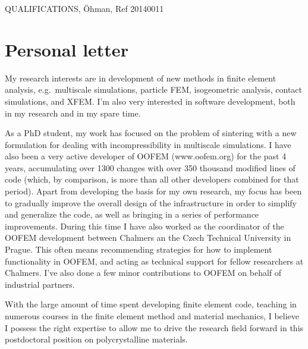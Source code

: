 \documentclass{article}
\begin{document}
\begin{center}
\Large
 QUALIFICATIONS, Öhman, Ref 20140011
\end{center}


\section{Personal letter}
My research interests are in development of new methods in finite element analysis, e.g.\ multiscale simulations, particle FEM, isogeometric analysis, contact simulations, and XFEM.
I'm also very interested in software development, both in my research and in my spare time.

As a PhD student, my work has focused on the problem of sintering with a new formulation for dealing with incompressibility in multiscale simulations.
I have also been a very active developer of OOFEM (www.oofem.org) for the past 4 years, accumulating over 1300 changes with over 350 thousand modified lines of code (which, by comparison, is more than all other developers combined for that period).
Apart from developing the basis for my own research, my focus has been to gradually improve the overall design of the infrastructure in order to simplify and generalize the code, as well as bringing in a series of performance improvements.
During this time I have also worked as the coordinator of the OOFEM development between Chalmers an the Czech Technical University in Prague.
This often means recommending strategies for how to implement functionality in OOFEM, and acting as technical support for fellow researchers at Chalmers.
I've also done a few minor contributions to OOFEM on behalf of industrial partners.

With the large amount of time spent developing finite element code, teaching in numerous courses in the finite element method and material mechanics, I believe I possess the right expertise to allow me to drive the research field forward in this postdoctoral position on polycrystalline materials.
\end{document}
